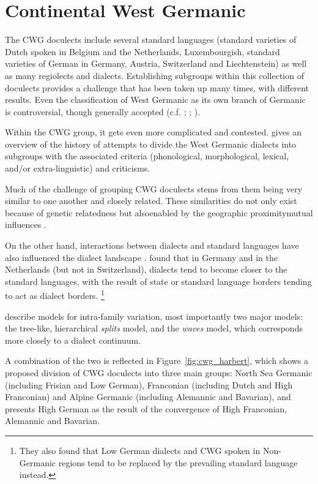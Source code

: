 \documentclass[a4paper]{article}
\begin{document}
\section{Continental West Germanic}
\label{sec:cwg}

The CWG doculects include several standard languages
(standard varieties of Dutch spoken in Belgium and the Netherlands,
Luxembourgish, standard varieties of German in
Germany, Austria, Switzerland and Liechtenstein)
as well as many regiolects and dialects.
Establishing subgroups within this collection of doculects provides a challenge
that has been taken up many times, with different results.
Even the classification of West Germanic
as its own branch of Germanic is controversial,
though generally accepted
(c.f. \citet{voyles1971problem}; \citet[pp. 7-8]{harbert2007germanic}; \citet{ringe2012cladistic}).

Within the CWG group, it gets even more complicated and contested.
\citet[pp. 72-80]{nielsen1989germanic} gives an overview of the history of attempts to divide the West Germanic dialects into subgroups with the associated criteria (phonological, morphological, lexical, and/or extra-linguistic) and criticisms.

Much of the challenge of grouping CWG doculects stems from
them being very similar to one another and closely related.
These similarities do not only exist because of genetic relatedness
but also\textemdash{}enabled by the geographic proximity\textemdash{}mutual influences
\citep[p. 8]{harbert2007germanic}.

On the other hand, 
interactions between dialects and standard languages
have also influenced the dialect landscape
\citep{coetsem1992interaction}.
\citet{kremer1990einfuehrung} found that in Germany and in the Netherlands
(but not in Switzerland), dialects tend to become closer to the standard languages,
with the result of state or standard language borders tending to act as dialect borders.%
\footnote{%
They also found that Low German dialects and CWG spoken in
Non-Germanic regions tend to be replaced by the prevailing standard language instead.}

\citet{heggarty2010splits} describe models for intra-family variation,
most importantly two major models:
the tree-like, hierarchical \textit{splits} model,
and the \textit{waves} model, which corresponds more closely to a dialect continuum.

A combination of the two is reflected in Figure~\ref{fig:cwg_harbert},
which shows a proposed division of CWG doculects
into three main groups: North Sea Germanic (including Frisian and Low German),
Franconian (including Dutch and High Franconian)
and Alpine Germanic (including Alemannic and Bavarian),
and presents High German as the result of the convergence
of High Franconian, Alemannic and Bavarian.
\end{document}
